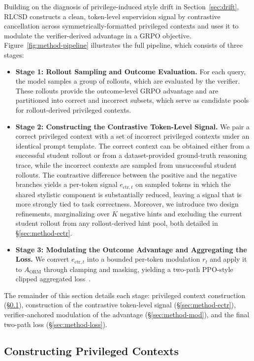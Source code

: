 Building on the diagnosis of privilege-induced style drift in Section~\ref{sec:drift}, RLCSD constructs a clean, token-level supervision signal by contrastive cancellation across symmetrically-formatted privileged contexts and uses it to modulate the verifier-derived advantage in a GRPO objective. Figure~\ref{fig:method-pipeline} illustrates the full pipeline, which consists of three stages:
\begin{itemize}
    \item \textbf{Stage 1: Rollout Sampling and Outcome Evaluation.}
    For each query, the model samples a group of rollouts, which are evaluated
    by the verifier. These rollouts provide the outcome-level GRPO advantage and are partitioned into correct and incorrect subsets, which serve as candidate pools for rollout-derived privileged contexts.
    \item \textbf{Stage 2: Constructing the Contrastive Token-Level Signal.}
    We pair a correct privileged context with a set of incorrect privileged
    contexts under an identical prompt template. The correct context can be
    obtained either from a successful student rollout or from a
    dataset-provided ground-truth reasoning trace, while the incorrect contexts are sampled from unsuccessful student rollouts.
    The contrastive difference between the positive and the negative branches yields a per-token signal $e_{\text{ctr},t}$ on sampled tokens in which the shared stylistic component is substantially reduced, leaving a signal that is more strongly tied to task correctness.
    Moreover, we introduce two design refinements, marginalizing over $K$ negative hints and excluding the current student rollout from any rollout-derived hint pool, both detailed in \S\ref{sec:method-ectr}.
    \item \textbf{Stage 3: Modulating the Outcome Advantage and Aggregating the Loss.} We convert $e_{\text{ctr},t}$ into a bounded per-token modulation $r_t$ and apply it to $A_{\text{ORM}}$ through clamping and masking, yielding a two-path PPO-style clipped aggregated loss~\citep{schulman2017proximal}.
\end{itemize}

The remainder of this section details each stage: privileged context construction (\S\ref{sec:method-hints}), construction of the contrastive token-level signal (\S\ref{sec:method-ectr}), verifier-anchored modulation of the advantage (\S\ref{sec:method-mod}), and the final two-path loss (\S\ref{sec:method-loss}).

\subsection{Constructing Privileged Contexts}
\label{sec:method-hints}

